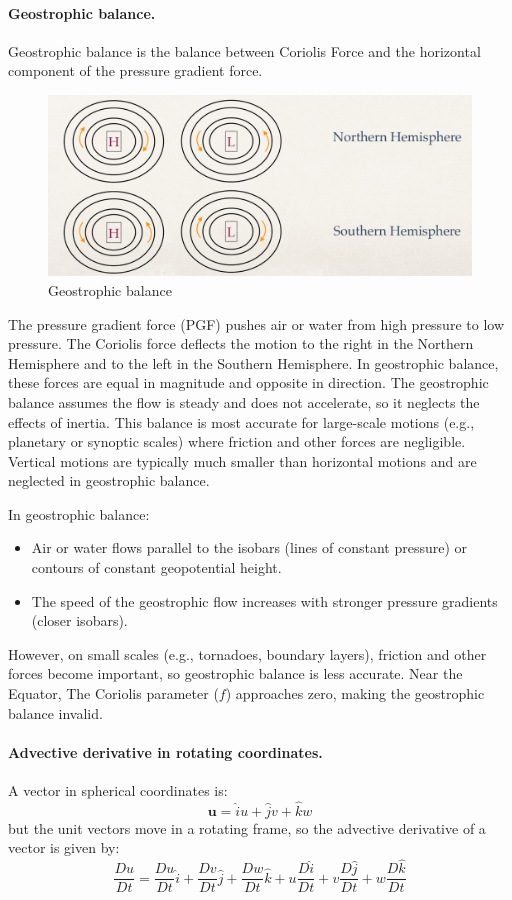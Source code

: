 \paragraph{Geostrophic balance.} Geostrophic balance is the balance between Coriolis Force and the horizontal component of the pressure gradient force.
\begin{figure}
	\centering
	\includegraphics[width=0.5\linewidth]{uploads/Screenshot 2024-11-20 195919.png}
	\caption{Geostrophic balance}
	\label{fig:enter-label}
\end{figure}
The pressure gradient force (PGF) pushes air or water from high pressure to low pressure. The Coriolis force deflects the motion to the right in the Northern Hemisphere and to the left in the Southern Hemisphere. In geostrophic balance, these forces are equal in magnitude and opposite in direction. The geostrophic balance assumes the flow is steady and does not accelerate, so it neglects the effects of inertia. This balance is most accurate for large-scale motions (e.g., planetary or synoptic scales) where friction and other forces are negligible. Vertical motions are typically much smaller than horizontal motions and are neglected in geostrophic balance.

In geostrophic balance:
\begin{itemize}
	\item Air or water flows parallel to the isobars (lines of constant pressure) or contours of constant geopotential height.
	\item The speed of the geostrophic flow increases with stronger pressure gradients (closer isobars).
\end{itemize}
However, on small scales (e.g., tornadoes, boundary layers), friction and other forces become important, so geostrophic balance is less accurate. Near the Equator, The Coriolis parameter ($f$) approaches zero, making the geostrophic balance invalid.

\paragraph{Advective derivative in rotating coordinates.} A vector in spherical coordinates is:
$$\mathbf{u}=\hat{i}u+\hat{j}v+\hat{k}w$$
but the unit vectors move in a rotating frame, so the advective derivative of a vector is given by:
\begin{equation}\label{eq.adv der in rotating}
	\frac{Du}{Dt}=\frac{Du}{Dt}\hat{i}+\frac{Dv}{Dt}\hat{j}+\frac{Dw}{Dt}\hat{k}+u\frac{D\hat{i}}{Dt}+v\frac{D\hat{j}}{Dt}+w\frac{D\hat{k}}{Dt}
\end{equation}
